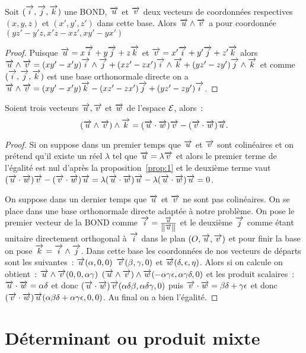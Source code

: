 \begin{prop}
  Soit $\bondtrois$ une BOND, $\vu$ et $\vv$ deux vecteurs de coordonnées respectives $(x,y,z)$ et $(x',y',z')$ dans cette base. Alors $\vu\wedge\vv$ a pour coordonnée $(yz'-y'z,x'z-xz',xy'-yx')$
\end{prop}
\begin{proof}
  Puisque $\vu=x\vi+y\vj+z\vk$ et $\vv=x'\vi+y'\vj+z'\vk$ alors $\vu\wedge\vv=(xy'-x'y)\vi\wedge\vj+(xz'-zx')\vi\wedge\vk+(yz'-zy')\vj\wedge\vk$ et comme $\bondtrois$ est une base orthonormale directe on a $\vu\wedge\vv=(xy'-x'y)\vk-(xz'-zx')\vj+(yz'-zy')\vi$.
\end{proof}
\begin{prop}
  Soient trois vecteurs $\vu,\vv$ et $\vw$ de l'espace $\E$, alors~:
  \begin{equation}
    (\vu\wedge\vv)\wedge\vk=(\vu\cdot\vw)\vv-(\vv\cdot\vw)\vu.
  \end{equation}
\end{prop}
\begin{proof}
  Si on suppose dans un premier temps que $\vu$ et $\vv$ sont colinéaires et on prétend qu'il existe un réel $\lambda$ tel que $\vu=\lambda\vv$ et alors le premier terme de l'égalité est nul d'après la proposition~\ref{prop:1} et le deuxième terme vaut $(\vu\cdot\vw)\vv-(\vv\cdot\vw)\vu=\lambda(\vu\cdot\vw)\vu-\lambda(\vu\cdot\vw)\vu=0$.
  
  On suppose dans un dernier temps que $\vu$ et $\vv$ ne sont pas colinéaires. On se place dans une base orthonormale directe adaptée à notre problème. On pose le premier vecteur de la BOND comme $\vi=\frac{\vu}{\norme{\vu}}$ et le deuxième $\vj$ comme étant unitaire directement orthogonal à $\vi$ dans le plan $(O,\vu,\vv)$ et pour finir la base on pose $\vk=\vi\wedge\vj$. Dans cette base les coordonnées de nos vecteurs de départs sont les suivantes~: $\vu(\alpha,0,0)$ $\vv(\beta,\gamma,0)$ et $\vw(\delta,\epsilon,\eta)$. Alors si on calcule on obtient~: $\vu\wedge\vv(0,0,\alpha\gamma)$ $(\vu\wedge\vv)\wedge\vw(-\alpha\gamma\epsilon,\alpha\gamma\delta,0)$ et les produit scalaires~: $\vu\cdot\vw=\alpha\delta$ et donc $(\vu\cdot\vw)\vv(\alpha\delta\beta, \alpha\delta\gamma,0)$ puis $\vv\cdot\vw=\beta\delta+\gamma\epsilon$ et donc $(\vv\cdot\vw)\vu(\alpha\beta\delta+\alpha\gamma\epsilon,0,0)$. Au final on a bien l'égalité.
\end{proof}

\section{Déterminant ou produit mixte}
